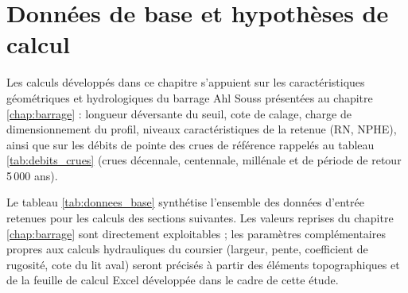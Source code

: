 \section{Données de base et hypothèses de calcul}
\label{sec:donnees_base_hypotheses}

Les calculs développés dans ce chapitre s'appuient sur les caractéristiques géométriques et hydrologiques du barrage Ahl Souss présentées au chapitre \ref{chap:barrage} : longueur déversante du seuil, cote de calage, charge de dimensionnement du profil, niveaux caractéristiques de la retenue (RN, NPHE), ainsi que sur les débits de pointe des crues de référence rappelés au tableau \ref{tab:debits_crues} (crues décennale, centennale, millénale et de période de retour 5\,000 ans).

Le tableau \ref{tab:donnees_base} synthétise l'ensemble des données d'entrée retenues pour les calculs des sections suivantes. Les valeurs reprises du chapitre \ref{chap:barrage} sont directement exploitables ; les paramètres complémentaires propres aux calculs hydrauliques du coursier (largeur, pente, coefficient de rugosité, cote du lit aval) seront précisés à partir des éléments topographiques et de la feuille de calcul Excel développée dans le cadre de cette étude.

